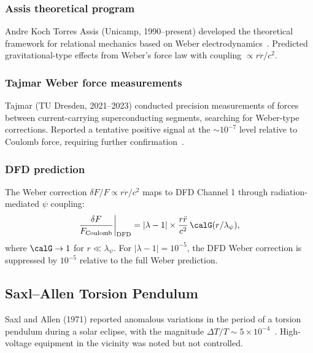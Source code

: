 \documentclass[aps,prd,twocolumn,superscriptaddress,floatfix,nofootinbib]{revtex4-2}
\newcommand{\lam}{\lambda}
\begin{document}
\subsubsection{Assis theoretical program}

Andre Koch Torres Assis (Unicamp, 1990--present) developed the
theoretical framework for relational mechanics based on Weber
electrodynamics~\cite{Assis1999}. Predicted gravitational-type effects
from Weber's force law with coupling $\propto r\ddot{r}/c^2$.

\subsubsection{Tajmar Weber force measurements}

Tajmar (TU Dresden, 2021--2023) conducted precision measurements of
forces between current-carrying superconducting segments, searching
for Weber-type corrections. Reported a tentative positive signal at
the $\sim 10^{-7}$ level relative to Coulomb force, requiring further
confirmation~\cite{Tajmar2022Weber}.

\subsubsection{DFD prediction}

The Weber correction $\delta F/F \propto r\ddot{r}/c^2$ maps to DFD
Channel 1 through radiation-mediated $\psi$ coupling:
\begin{equation}
\frac{\delta F}{F_{\rm Coulomb}}\bigg|_{\rm DFD}
= |\lam-1| \times \frac{r\ddot{r}}{c^2}\,\calG(r/\lambda_\psi),
\end{equation}
where $\calG \to 1$ for $r \ll \lambda_\psi$. For $|\lam-1| = 10^{-5}$,
the DFD Weber correction is suppressed by $10^{-5}$ relative to the
full Weber prediction.

\subsection{Saxl--Allen Torsion Pendulum}\label{sec:saxl}

Saxl and Allen (1971) reported anomalous variations in the period of a
torsion pendulum during a solar eclipse, with the magnitude
$\Delta T/T \sim 5 \times 10^{-4}$~\cite{Saxl1971}. High-voltage
equipment in the vicinity was noted but not controlled.
\end{document}
